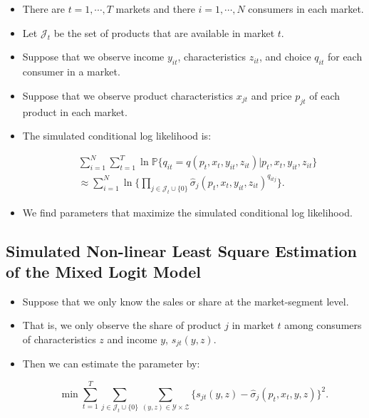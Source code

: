 \documentclass[]{book}
\providecommand{\tightlist}{%
  \setlength{\itemsep}{0pt}\setlength{\parskip}{0pt}}
\begin{document}
\begin{itemize}
\tightlist
\item
  There are \(t = 1, \cdots, T\) markets and there \(i = 1, \cdots, N\)
  consumers in each market.
\item
  Let \(\mathcal{J}_t\) be the set of products that are available in
  market \(t\).
\item
  Suppose that we observe income \(y_{it}\), characteristics \(z_{it}\),
  and choice \(q_{it}\) for each consumer in a market.
\item
  Suppose that we observe product characteristics \(x_{jt}\) and price
  \(p_{jt}\) of each product in each market.
\item
  The simulated conditional log likelihood is:

  \begin{equation}
  \begin{split}
  &\sum_{i = 1}^N \sum_{t = 1}^T \ln \mathbb{P}\{q_{it} = q(p_t, x_t, y_{it}, z_{it})|p_t, x_t, y_{it}, z_{it}\} \\
  &\approx \sum_{i = 1}^N \ln \Bigg\{ \prod_{j \in \mathcal{J}_t \cup \{0\}} \hat{\sigma}_{j}(p_t, x_t, y_{it}, z_{it})^{q_{itj}} \Bigg\}.
  \end{split}
  \end{equation}
\item
  We find parameters that maximize the simulated conditional log
  likelihood.
\end{itemize}

\subsection{Simulated Non-linear Least Square Estimation of the Mixed
Logit
Model}\label{simulated-non-linear-least-square-estimation-of-the-mixed-logit-model}

\begin{itemize}
\tightlist
\item
  Suppose that we only know the sales or share at the market-segment
  level.
\item
  That is, we only observe the share of product \(j\) in market \(t\)
  among consumers of characteristics \(z\) and income \(y\),
  \(s_{jt}(y, z)\).
\item
  Then we can estimate the parameter by:

  \begin{equation}
  \min \sum_{t = 1}^T \sum_{j \in \mathcal{J}_t \cup \{0\}} \sum_{(y, z) \in \mathcal{Y} \times \mathcal{Z}} \{s_{jt}(y, z) - \hat{\sigma}_{j}(p_t, x_t, y, z)\}^2.
  \end{equation}
\end{itemize}
\end{document}
